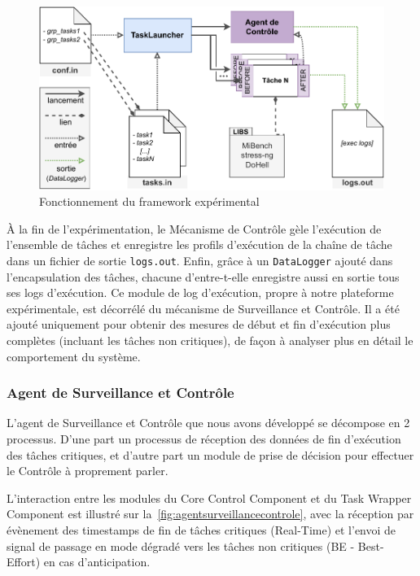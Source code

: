 \documentclass[french, a4paper, 11pt, twoside, pdftex]{StyleThese}
\begin{document}
    \begin{figure}[ht]
    	\centering
    	\includegraphics[width=\linewidth]{schemas/Implementation_Archi}
    	\caption{Fonctionnement du framework expérimental}
    	\label{fig:implementationarchi}
    \end{figure}

    À la fin de l'expérimentation, le Mécanisme de Contrôle gèle l'exécution de l'ensemble de tâches et enregistre les profils d'exécution de la chaîne de tâche dans un fichier de sortie \texttt{logs.out}.  Enfin, grâce à un \texttt{DataLogger} ajouté dans l'encapsulation des tâches, chacune d'entre-t-elle enregistre aussi en sortie tous ses logs d'exécution. Ce module de log d'exécution, propre à notre plateforme expérimentale, est décorrélé du mécanisme de Surveillance et Contrôle. Il a été ajouté uniquement pour obtenir des mesures de début et fin d'exécution plus complètes (incluant les tâches non critiques), de façon à analyser plus en détail le comportement du système.
        
    	\subsubsection{Agent de Surveillance et Contrôle}

	L'agent de Surveillance et Contrôle que nous avons développé se décompose en 2 processus. D'une part un processus de réception des données de fin d'exécution des tâches critiques, et d'autre part un module de prise de décision pour effectuer le Contrôle à proprement parler.
	
	L’interaction entre les modules du Core Control Component et du Task Wrapper Component est illustré sur la~\autoref{fig:agentsurveillancecontrole}, avec la réception par évènement des timestamps de fin de tâches critiques (Real-Time) et l'envoi de signal de passage en mode dégradé vers les tâches non critiques (BE - Best-Effort) en cas d'anticipation.
\end{document}
